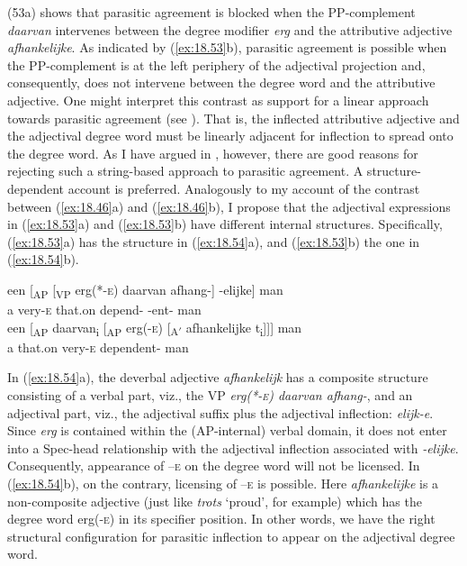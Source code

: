 \documentclass[output=paper]{langsci/langscibook}
\begin{document}
(53a) shows that parasitic agreement is blocked when the PP-complement
\emph{daarvan} intervenes between the degree modifier \emph{erg} and the
attributive adjective \emph{afhankelijke}. As indicated by (\ref{ex:18.53}b),
parasitic agreement is possible when the PP-complement is at the left periphery
of the adjectival projection and, consequently, does not intervene between the
degree word and the attributive adjective. One might interpret this contrast as
support for a linear approach towards parasitic agreement (see
). That is, the inflected attributive adjective and the
adjectival degree word must be linearly adjacent for inflection to spread onto
the degree word. As I have argued in , however, there are
good reasons for rejecting such a string-based approach to parasitic agreement.
A structure-dependent account is preferred. Analogously to my account of the
contrast between (\ref{ex:18.46}a) and (\ref{ex:18.46}b), I propose that the
adjectival expressions in (\ref{ex:18.53}a) and (\ref{ex:18.53}b) have different
internal structures. Specifically, (\ref{ex:18.53}a) has the structure in
(\ref{ex:18.54}a), and (\ref{ex:18.53}b) the one in (\ref{ex:18.54}b).

\ea%
    \label{ex:18.54}
	\ea
	\gll een [\textsubscript{AP} [\textsubscript{VP} erg(*-\textsc{e}) daarvan afhang-] -elijke] man\\ a {} {} very-\textsc{e} that.on depend- -ent-\Agr{} man\\
	\ex
	\gll een [\textsubscript{AP} daarvan\textsubscript{i} [\textsubscript{AP} erg(-\textsc{e}) [\textsubscript{A$'$} afhankelijke t\textsubscript{i}]]] man\\
        a {} that.on {} very-\textsc{e} {} dependent-\Agr{} man\\
	\z
\z

In (\ref{ex:18.54}a), the deverbal adjective \emph{afhankelijk} has a composite
structure consisting of a verbal part, viz., the VP \emph{erg(*-\textsc{e})
daarvan afhang-}, and an adjectival part, viz., the adjectival suffix plus the
adjectival inflection: \emph{elijk-e}. Since \emph{erg} is contained within the
(AP-internal) verbal domain, it does not enter into a Spec-head relationship
with the adjectival inflection associated with \emph{-elijke}. Consequently,
appearance of –\textsc{e} on the degree word will not be licensed. In
(\ref{ex:18.54}b), on the contrary, licensing of –\textsc{e} is possible. Here
\emph{afhankelijke} is a non-composite adjective (just like \emph{trots}
‘proud’, for example) which has the degree word erg(-\textsc{e)} in its
specifier position. In other words, we have the right structural configuration
for parasitic inflection to appear on the adjectival degree word.
\end{document}
